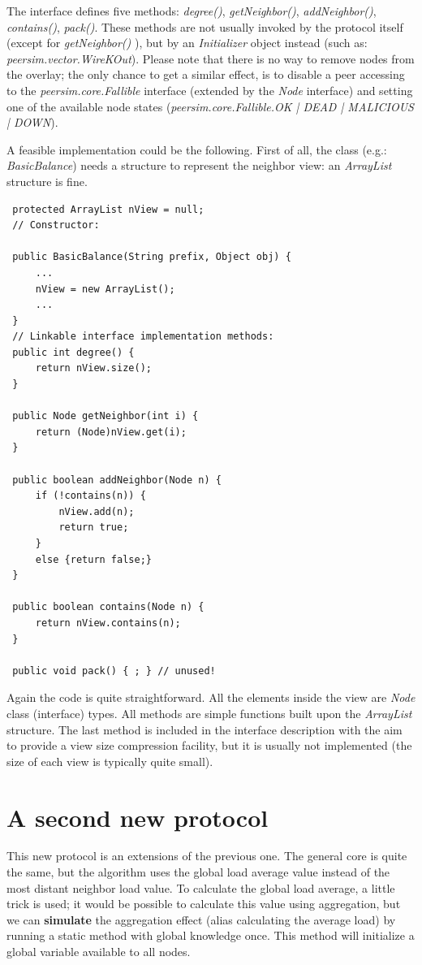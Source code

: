 \documentclass[a4paper,11pt]{article}
\begin{document}
The interface defines five methods: \emph{degree()}, \emph{getNeighbor()},
\emph{addNeighbor()}, \emph{contains()}, \emph{pack()}. These methods
are not usually invoked by the protocol itself (except for \emph{getNeighbor()}
), but by an \emph{Initializer} object instead (such as: 
\emph{peersim.vector.WireKOut}).
Please note that there
is no way to remove nodes from the overlay; the only chance to get
a similar effect, is to disable a peer accessing to the \emph{peersim.core.Fallible}
interface (extended by the \emph{Node} interface) and setting one
of the available node states (\emph{peersim.core.Fallible.OK | DEAD | 
MALICIOUS | DOWN}). 

A feasible implementation could be the following. First of all, the
class (e.g.: \emph{BasicBalance}) needs a structure to represent the
neighbor view: an \emph{ArrayList} structure is fine.

\footnotesize
\begin{verbatim}
 protected ArrayList nView = null;
 // Constructor:
 
 public BasicBalance(String prefix, Object obj) {
     ...
     nView = new ArrayList();
     ...
 }
 // Linkable interface implementation methods:
 public int degree() {
     return nView.size();
 }
 
 public Node getNeighbor(int i) {
     return (Node)nView.get(i);
 } 
 
 public boolean addNeighbor(Node n) {
     if (!contains(n)) {
         nView.add(n);
         return true;
     }
     else {return false;}
 }
 
 public boolean contains(Node n) {
     return nView.contains(n);
 }
 
 public void pack() { ; } // unused!
\end{verbatim}
\normalsize

Again the code is quite straightforward. All the elements inside the
view are \emph{Node} class (interface) types. All methods are simple
functions built upon the \emph{ArrayList} structure. The last method
is included in the interface description with the aim to provide a
view size compression facility, but it is usually not implemented (the
size of each view is typically quite small).


\section{A second new protocol}

This new protocol is an extensions of the previous one. The general
core is quite the same, but the algorithm uses the global load average
value instead of the most distant neighbor load value. To calculate
the global load average, a little trick is used; it would be possible
to calculate this value using aggregation, but we can \textbf{simulate}
the aggregation effect (alias calculating the average load) by running
a static method with global knowledge once. This method will initialize
a global variable available to all nodes. 
\end{document}
